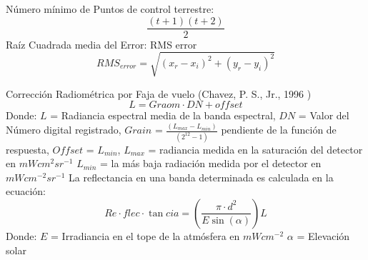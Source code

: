     Número mínimo de Puntos de control terrestre:
\begin{equation}
    \frac{(t+1)(t+2)}{2}
\end{equation}
Raíz Cuadrada media del Error: RMS error
\begin{equation}
    RMS_{error} = \sqrt{\left(x_r - x_i\right)^2 +\left(y_r - y_i\right)^2}
\end{equation}

Corrección Radiométrica por Faja de vuelo (Chavez, P. S., Jr., 1996 )
\begin{equation}
    L = Graom\cdot DN + offset
\end{equation}
Donde: $L$ =  Radiancia espectral  media de la banda espectral, $DN$ = Valor del Número digital registrado, $Grain$ =  $\frac{(L_{max} - L_{min})}{(2^{12}-1)}$  pendiente de la función de respuesta, $Offset$ =  $L_{min}$, $L_{max}$ =  radiancia medida en la saturación del detector en $mWcm^2sr^{-1}$
      $L_{min}$ =  la más baja radiación medida por el detector en $mWcm^{-2}sr^{-1}$
La reflectancia en una banda determinada es calculada en la ecuación:
\begin{equation}
    Re\cdot flec \cdot\tan{cia} =\left(\frac{\pi\cdot d^2}{E\sin{(\alpha)}}\right)L
\end{equation}
Donde: $E$ =  Irradiancia en el tope de la atmósfera en $mWcm^{-2}$ 
$\alpha$ =  Elevación solar

